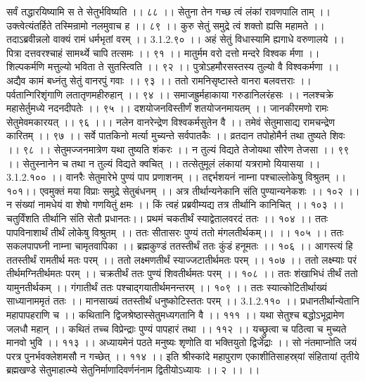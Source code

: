 सर्वं तद्धारयिष्यामि स ते सेतुर्भविष्यति ।। ८८ ।।
सेतुना तेन गच्छ त्वं लंकां रावणपालि ताम् ।।
उक्त्वेत्यंतर्हिते तस्मिन्रामो नलमुवाच ह ।। ८९ ।।
कुरु सेतुं समुद्रे त्वं शक्तो ह्यसि महामते ।।
तदाऽब्रवीन्नलो वाक्यं रामं धर्मभृतां वरम् ।। 3.1.2.९० ।।
अहं सेतुं विधास्यामि ह्यगाधे वरुणालये ।।
पित्रा दत्तवरश्चाहं सामर्थ्ये चापि तत्समः ।। ९१ ।।
मातुर्मम वरो दत्तो मन्दरे विश्वक र्मणा ।।
शिल्पकर्मणि मत्तुल्यो भविता ते सुतस्त्विति ।। ९२ ।।
पुत्रोऽहमौरसस्तस्य तुल्यो वै विश्वकर्मणा ।।
अद्यैव कामं बध्नंतु सेतुं वानरपुं गवाः ।। ९३ ।।
ततो रामनिसृष्टास्ते वानरा बलवत्तराः ।।
पर्वतान्गिरिशृंगाणि लतातृणमहीरुहान् ।। ९४ ।।
समाजह्रुर्महाकाया गरुडानिलरंहसः ।।
नलश्चक्रे महासेर्तुमध्ये नदनदीपतेः ।। ९५ ।।
दशयोजनविस्तीर्णं शतयोजनमायतम् ।।
जानकीरमणो रामः सेतुमेवमकारयत् ।। ९६ ।।।
नलेन वानरेन्द्रेण विश्वकर्मसुतेन वै ।।
तमेवं सेतुमासाद्य रामचन्द्रेण कारितम् ।। ९७ ।।
सर्वे पातकिनो मर्त्या मुच्यन्ते सर्वपातकैः ।।
व्रतदान तपोहोमैर्न तथा तुष्यते शिवः ।। ९८ ।।
सेतुमज्जनमात्रेण यथा तुष्यति शंकरः ।।
न तुल्यं विद्यते तेजोयथा सौरेण तेजसा ।। ९९ ।।
सेतुस्नानेन च तथा न तुल्यं विद्यते क्वचित् ।।
तत्सेतुमूलं लंकायां यत्ररामो यियासया ।। 3.1.2.१०० ।।
वानरैः सेतुमारेभे पुण्यं पाप प्रणाशनम् ।।
तद्दर्भशयनं नाम्ना पश्चाल्लोकेषु विश्रुतम् ।। १०१।।
एवमुक्तं मया विप्राः समुद्रे सेतुबंधनम् ।।
अत्र तीर्थान्यनेकानि संति पुण्यान्यनेकशः ।। १०२ ।।
न संख्यां नामधेयं वा शेषो गणयितुं क्षमः ।।
किं त्वहं प्रब्रवीम्यद्य तत्र तीर्थानि कानिचित् ।। १०३ ।।
चतुर्विंशति तीर्थानि संति सेतौ प्रधानतः।।
प्रथमं चकतीर्थं स्याद्वेतालवरदं ततः ।। १०४ ।।
ततः पापविनाशार्थं तीर्थं लोकेषु विश्रुतम् ।।
ततः सीतासरः पुण्यं ततो मंगलतीर्थकम्।। ।। १०५ ।।
ततः सकलपापघ्नी नाम्ना चामृतवापिका ।।
ब्रह्मकुण्डं ततस्तीर्थं ततः कुंडं हनूमतः ।। १०६ ।।
आगस्त्यं हि ततस्तीर्थं रामतीर्थ मतः परम् ।।
ततो लक्ष्मणतीर्थं स्याज्जटातीर्थमतः परम् ।। १०७ ।।
ततो लक्ष्म्याः परं तीर्थमग्नितीर्थमतः परम् ।।
चक्रतीर्थं ततः पुण्यं शिवतीर्थमतः परम् ।। १०८ ।।
ततः शंखाभिधं तीर्थं ततो यामुनतीर्थकम् ।।
गंगातीर्थं ततः पश्चाद्गयातीर्थमनन्तरम् ।। १०९ ।।
ततः स्यात्कोटितीर्थाख्यं साध्यानाममृतं ततः ।।
मानसाख्यं ततस्तीर्थं धनुष्कोटिस्ततः परम् ।। 3.1.2.११० ।।
प्रधानतीर्थान्येतानि महापापहराणि च ।।
कथितानि द्विजश्रेष्ठास्सेतुमध्यगतानि वै ।। १११ ।।
यथा सेतुश्च बद्धोऽभूद्रामेण जलधौ महान् ।।
कथितं तच्च विप्रेन्द्राः पुण्यं पापहारं तथा ।। ११२ ।।
यच्छ्रुत्वा च पठित्वा च मुच्यते मानवो भुवि ।। ११३ ।।
अध्यायमेनं पठते मनुष्यः शृणोति वा भक्तियुतो द्विजेंद्राः ।।
सो नंतमाप्नोति जयं परत्र पुनर्भवक्लेशमसौ न गच्छेत् ।। ११४ ।।
इति श्रीस्कांदे महापुराण एकाशीतिसाहस्र्यां संहितायां तृतीये ब्रह्मखण्डे सेतुमाहात्म्ये सेतुनिर्माणादिवर्णनंनाम द्वितीयोऽध्यायः ।। २ ।। ।।


